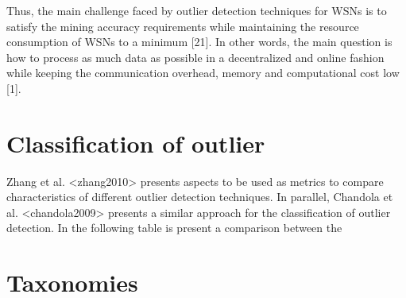 \begin{framed}
	Thus, the main challenge faced by outlier detection techniques for WSNs is to satisfy the mining accuracy requirements while maintaining the resource consumption of WSNs
	to a minimum [21]. In other words, the main question is how to
	process as much data as possible in a decentralized and online
	fashion while keeping the communication overhead, memory
	and computational cost low [1].
\end{framed}


\section{Classification of outlier}

Zhang et al. <zhang2010> presents aspects to be used as metrics to compare characteristics of different outlier detection techniques. In parallel, Chandola et al. <chandola2009> presents a similar approach for the classification of outlier detection. In the following table is present a comparison between the 



\section{Taxonomies}
